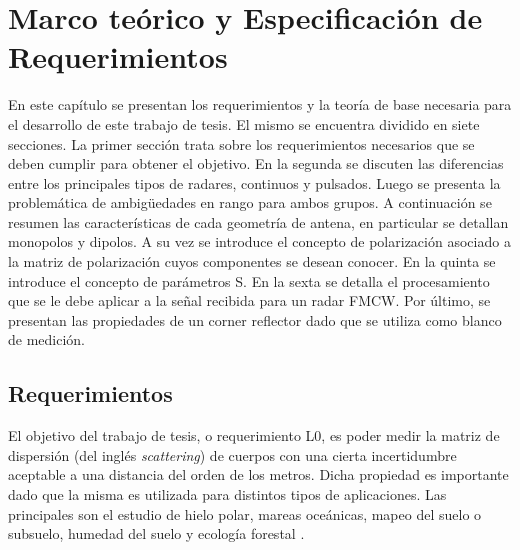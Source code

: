 
\chapter{Marco teórico y Especificación de Requerimientos} \label{ch:theory}


\ifpdf
    \graphicspath{{Chapter2/Figs/Raster/}{Chapter2/Figs/PDF/}{Chapter2/Figs/}}
\else
    \graphicspath{{Chapter2/Figs/Vector/}{Chapter2/Figs/}}
\fi

En este capítulo se presentan los requerimientos y la teoría de base necesaria para el desarrollo de este trabajo de tesis. El mismo se encuentra dividido en siete secciones. La primer sección trata sobre los requerimientos necesarios que se deben cumplir para obtener el objetivo. En la segunda se discuten las diferencias entre los principales tipos de radares, continuos y pulsados. Luego se presenta la problemática de ambigüedades en rango para ambos grupos. A continuación se resumen las características de cada geometría de antena, en particular se detallan monopolos y dipolos. A su vez se introduce el concepto de polarización asociado a la matriz de polarización cuyos componentes se desean conocer. En la quinta se introduce el concepto de parámetros S. En la sexta se detalla el procesamiento que se le debe aplicar a la señal recibida para un radar FMCW. Por último, se presentan las propiedades de un corner reflector dado que se utiliza como blanco de medición.

\section{Requerimientos}

El objetivo del trabajo de tesis, o requerimiento L0, es poder medir la matriz de dispersión (del inglés \textit{scattering}) de cuerpos con una cierta incertidumbre aceptable a una distancia del orden de los metros. Dicha propiedad es importante dado que la misma es utilizada para distintos tipos de aplicaciones. Las principales son el estudio de hielo polar, mareas oceánicas, mapeo del suelo o subsuelo, humedad del suelo y ecología forestal \cite{Curlander}.

